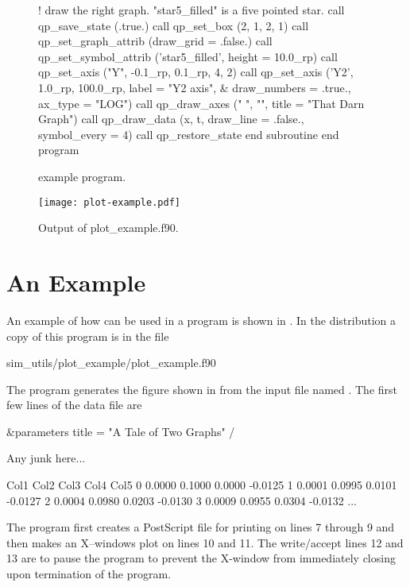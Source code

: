 \begin{figure}
\begin{listing}{1}
    ! draw the right graph. "star5_filled" is a five pointed star.
    call qp_save_state (.true.)
    call qp_set_box (2, 1, 2, 1)
    call qp_set_graph_attrib (draw_grid = .false.)
    call qp_set_symbol_attrib ('star5_filled', height = 10.0_rp)
    call qp_set_axis ("Y", -0.1_rp, 0.1_rp, 4, 2)
    call qp_set_axis ('Y2', 1.0_rp, 100.0_rp, label = "Y2 axis", &
                                draw_numbers = .true., ax_type = "LOG")
    call qp_draw_axes ("      ", "\fsLY\fn", title = "That Darn Graph")
    call qp_draw_data (x, t, draw_line = .false., symbol_every = 4)
    call qp_restore_state
  end subroutine
  end program
\end{listing}
\caption{\quickplot example program.}
\label{f:plot.example}
\end{figure}


\begin{figure}
\centering
\texttt{[image: plot-example.pdf]}
\caption{Output of plot_example.f90.}
\label{f:plot.out}
\end{figure}

\section{An Example}
\label{s:plot.example}

An example of how \quickplot can be used in a program is shown in
. In the \bmad distribution a copy of this
program is in the file
\begin{example}
  sim_utils/plot_example/plot_example.f90
\end{example}
The  program generates the figure shown in
 from the input file named . The
first few lines of the data file are
\begin{example}
  \&parameters
    title = "A Tale of Two Graphs"
  /
 
  Any junk here...
 
  Col1      Col2      Col3      Col4      Col5
     0    0.0000    0.1000    0.0000   -0.0125
     1    0.0001    0.0995    0.0101   -0.0127
     2    0.0004    0.0980    0.0203   -0.0130
     3    0.0009    0.0955    0.0304   -0.0132
     ...
\end{example}

The program first creates a PostScript file for printing on lines 7
through 9 and then makes an X--windows plot on lines 10 and 11. The
write/accept lines 12 and 13 are to pause the program to prevent the
X-window from immediately closing upon termination of the program.

